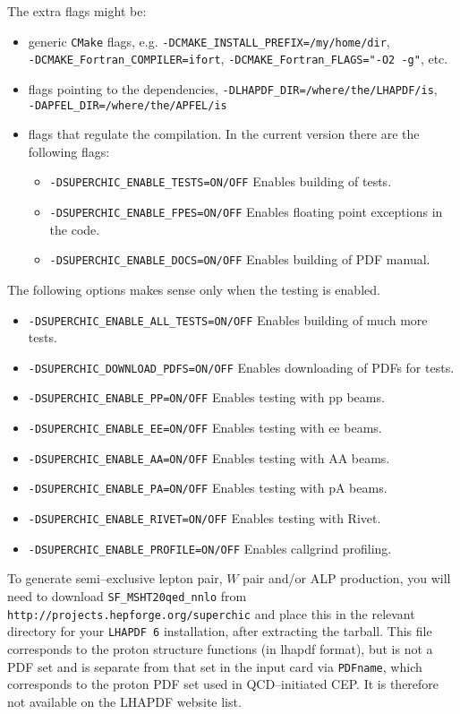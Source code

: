\documentclass[12pt]{article}
\begin{document}
The extra flags might be:
\begin{itemize}
\item  generic \texttt{CMake} flags, e.g. \texttt{-DCMAKE\_INSTALL\_PREFIX=/my/home/dir},\\ \texttt{-DCMAKE\_Fortran\_COMPILER=ifort}, \texttt{-DCMAKE\_Fortran\_FLAGS="-O2 -g"}, etc.
\item  flags pointing to the dependencies, \texttt{-DLHAPDF\_DIR=/where/the/LHAPDF/is}, \\\texttt{-DAPFEL\_DIR=/where/the/APFEL/is}
\item  {flags that regulate the compilation. In the current version there are the following flags: \begin{itemize}
 \item  \texttt{-DSUPERCHIC\_ENABLE\_TESTS=ON/OFF}     Enables building of tests.
 \item  \texttt{-DSUPERCHIC\_ENABLE\_FPES=ON/OFF}      Enables floating point exceptions in the code.
 \item  \texttt{-DSUPERCHIC\_ENABLE\_DOCS=ON/OFF}      Enables building of PDF manual. 
 \end{itemize}}
 \end{itemize}
 The following options makes sense only when the testing is enabled.
 \begin{itemize}
 \item \texttt{-DSUPERCHIC\_ENABLE\_ALL\_TESTS=ON/OFF} Enables building of much more tests.
 \item  \texttt{-DSUPERCHIC\_DOWNLOAD\_PDFS=ON/OFF}    Enables downloading of PDFs for tests. 
 \item    \texttt{-DSUPERCHIC\_ENABLE\_PP=ON/OFF}        Enables testing with pp beams.
 \item  \texttt{-DSUPERCHIC\_ENABLE\_EE=ON/OFF}        Enables testing with ee beams.
 \item  \texttt{-DSUPERCHIC\_ENABLE\_AA=ON/OFF}        Enables testing with AA beams.
 \item  \texttt{-DSUPERCHIC\_ENABLE\_PA=ON/OFF}        Enables testing with pA beams. 
 \item  \texttt{-DSUPERCHIC\_ENABLE\_RIVET=ON/OFF}     Enables testing with Rivet.
 \item  \texttt{-DSUPERCHIC\_ENABLE\_PROFILE=ON/OFF}   Enables callgrind profiling.
\end{itemize}


To generate semi--exclusive lepton pair, $W$ pair and/or ALP production, 
you will need to download \texttt{SF\_MSHT20qed\_nnlo} from 
\texttt{http://projects.hepforge.org/superchic} and place this in the 
relevant directory for your \texttt{LHAPDF 6} installation, after 
extracting the tarball. This file corresponds to the proton structure 
functions (in lhapdf format), but is not a PDF set and is separate from 
that set in the input card via \texttt{PDFname}, which corresponds to 
the proton PDF set used in QCD--initiated CEP. It is therefore not 
available on the LHAPDF website list.
\end{document}
